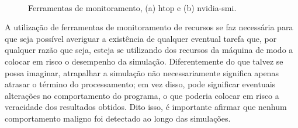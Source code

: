 \begin{figure}[H]
    \centering
    \\
    \vspace{0.5cm}
    \caption{Ferramentas de monitoramento, (a) htop e (b) nvidia-smi.}
    \label{fig:results_resources_monitoring_tools}
\end{figure}

A utilização de ferramentas de monitoramento de recursos se faz necessária para que seja possível averiguar a existência de qualquer eventual tarefa que, por qualquer razão que seja, esteja se utilizando dos recursos da máquina de modo a colocar em risco o desempenho da simulação. Diferentemente do que talvez se possa imaginar, atrapalhar a simulação não necessariamente significa apenas atrasar o término do processamento; em vez disso, pode significar eventuais alterações no comportamento do programa, o que poderia colocar em risco a veracidade dos resultados obtidos. Dito isso, é importante afirmar que nenhum comportamento maligno foi detectado ao longo das simulações.




